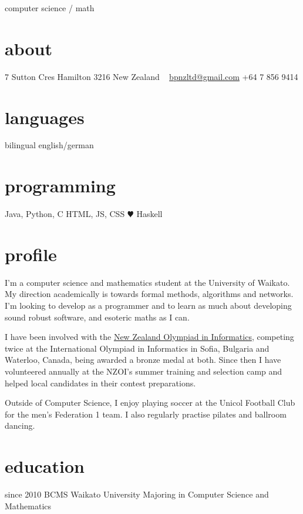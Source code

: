 \documentclass[]{friggeri-cv}
\begin{document}
       {computer science / math}

\begin{aside}
  \section{about}
    7 Sutton Cres
    Hamilton 3216
    New Zealand
    ~
    \href{mailto:bpnzltd@gmail.com}{bpnzltd@gmail.com}
    +64 7 856 9414
  \section{languages}
    bilingual english/german
  \section{programming}
    Java, Python, C
    HTML, JS, CSS
    {\color{red} $\varheartsuit$} Haskell
\end{aside}

\section{profile}

I'm a computer science and mathematics student at the University of Waikato.
My direction academically is towards formal methods, algorithms and networks.
I'm looking to develop as a programmer and to learn as much about developing
sound robust software, and esoteric maths as I can.

I have been involved with the \href{http://www.nzoi.org.nz/}
{New Zealand Olympiad in Informatics}, competing twice at the International
Olympiad in Informatics in Sofia, Bulgaria and Waterloo, Canada, being
awarded a bronze medal at both. Since then I have volunteered annually at the
NZOI's summer training and selection camp and helped local candidates in
their contest preparations.

Outside of Computer Science, I enjoy playing soccer at the Unicol Football
Club for the men's Federation 1 team. I also regularly practise pilates and
ballroom dancing.

\section{education}

\begin{entrylist}
  \entry
    {since 2010}
    {BCMS }
    {Waikato University}
    {Majoring in Computer Science and Mathematics}
\end{entrylist}
\end{document}
